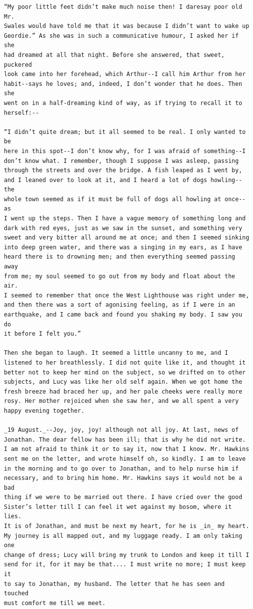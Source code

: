 \documentclass{article}
\begin{document}
\begin{verbatim}
“My poor little feet didn’t make much noise then! I daresay poor old Mr.
Swales would have told me that it was because I didn’t want to wake up
Geordie.” As she was in such a communicative humour, I asked her if she
had dreamed at all that night. Before she answered, that sweet, puckered
look came into her forehead, which Arthur--I call him Arthur from her
habit--says he loves; and, indeed, I don’t wonder that he does. Then she
went on in a half-dreaming kind of way, as if trying to recall it to
herself:--

“I didn’t quite dream; but it all seemed to be real. I only wanted to be
here in this spot--I don’t know why, for I was afraid of something--I
don’t know what. I remember, though I suppose I was asleep, passing
through the streets and over the bridge. A fish leaped as I went by,
and I leaned over to look at it, and I heard a lot of dogs howling--the
whole town seemed as if it must be full of dogs all howling at once--as
I went up the steps. Then I have a vague memory of something long and
dark with red eyes, just as we saw in the sunset, and something very
sweet and very bitter all around me at once; and then I seemed sinking
into deep green water, and there was a singing in my ears, as I have
heard there is to drowning men; and then everything seemed passing away
from me; my soul seemed to go out from my body and float about the air.
I seemed to remember that once the West Lighthouse was right under me,
and then there was a sort of agonising feeling, as if I were in an
earthquake, and I came back and found you shaking my body. I saw you do
it before I felt you.”

Then she began to laugh. It seemed a little uncanny to me, and I
listened to her breathlessly. I did not quite like it, and thought it
better not to keep her mind on the subject, so we drifted on to other
subjects, and Lucy was like her old self again. When we got home the
fresh breeze had braced her up, and her pale cheeks were really more
rosy. Her mother rejoiced when she saw her, and we all spent a very
happy evening together.

_19 August._--Joy, joy, joy! although not all joy. At last, news of
Jonathan. The dear fellow has been ill; that is why he did not write.
I am not afraid to think it or to say it, now that I know. Mr. Hawkins
sent me on the letter, and wrote himself oh, so kindly. I am to leave
in the morning and to go over to Jonathan, and to help nurse him if
necessary, and to bring him home. Mr. Hawkins says it would not be a bad
thing if we were to be married out there. I have cried over the good
Sister’s letter till I can feel it wet against my bosom, where it lies.
It is of Jonathan, and must be next my heart, for he is _in_ my heart.
My journey is all mapped out, and my luggage ready. I am only taking one
change of dress; Lucy will bring my trunk to London and keep it till I
send for it, for it may be that.... I must write no more; I must keep it
to say to Jonathan, my husband. The letter that he has seen and touched
must comfort me till we meet.



\end{verbatim}
\end{document}
